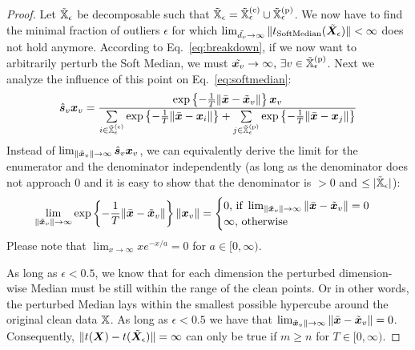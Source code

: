 \documentclass[sigconf,authordraft]{acmart}
\newcommand{\features}{\mX}
\newcommand{\featset}{\sX}
\newcommand{\softout}{\vs}
\newcommand{\pertm}{\tilde{\mX}_\epsilon}
\newcommand{\pertmset}{\tilde{\sX}_\epsilon}
\begin{document}
\begin{proof}\label{proof:actual_soft_median}
  Let \( \pertmset \) be decomposable such that \(\pertmset = \pertmset^{(\text{c})} \cup \pertmset^{(\text{p})} \). We now have to find the minimal fraction of outliers \(\epsilon\) for which \newline\(\lim_{\tilde{\evd_{v}} \to \infty} \|t_{\text{SoftMedian}}(\pertm)\| < \infty\) does not hold anymore. According to Eq.~\ref{eq:breakdown}, if we now want to arbitrarily perturb the Soft Median, 
  we must \(\tilde{\vx_{v}} \to \infty,\,\exists v \in \pertmset^{(\text{p})}\). Next we analyze the influence of this point on Eq.~\ref{eq:softmedian}:
  \[
    \begin{aligned}
      \hat{\softout}_{v} \vx_{v}
      &= \frac{\exp \left\{-\frac{1}{T} \|\bar{\vx} - \tilde{\vx}_{v}\| \right\} \vx_{v}}{\sum\limits_{i \in \pertmset^{(\text{c})}} \exp \left \{-\frac{1}{T} \|\bar{\vx} - \vx_{i}\| \right\} + \sum\limits_{j \in \pertmset^{(\text{p})}} \exp \left \{-\frac{1}{T} \|\bar{\vx} - \vx_{j}\| \right\}} \\
    \end{aligned}
  \]
  Instead of \(\lim_{\|\tilde{\vx}_{v}\| \to \infty} \hat{\softout}_{v} \vx_{v}\), we can equivalently derive the limit for the enumerator and the denominator independently (as long as the denominator does not approach 0 and it is easy to show that the denominator is \(> 0\) and \(\le |\pertmset|\)):
  \[
    \begin{aligned}
      \lim_{\|\tilde{{\bm{x}}}_{v}\| \to \infty} \exp \left\{-\frac{1}{T} \|\bar{{\bm{x}}} - \tilde{{\bm{x}}}_{v}\| \right\} \|{\bm{x}}_{v}\| = 
      \begin{cases}
        0 \text{, if } \lim_{\|\tilde{{\bm{x}}}_{v}\| \to \infty} \|\bar{{\bm{x}}} - \tilde{{\bm{x}}}_{v}\| = 0\\
        \infty\text{, otherwise}
      \end{cases}
    \end{aligned}
  \]
  Please note that \(\lim_{x \to \infty} x e^{-x/a} = 0\) for \(a \in [0, \infty)\). 
  
  As long as \(\epsilon < 0.5\), we know that for each dimension the perturbed dimension-wise Median must be still within the range of the clean points. Or in other words, the perturbed Median lays within the smallest possible hypercube around the original clean data \(\featset\). As long as \(\epsilon < 0.5\) we have that \(\lim_{\tilde{{\bm{x}}}_{v}\| \to \infty} \|\bar{{\bm{x}}} - \tilde{{\bm{x}}}_{v}\| = 0\). Consequently, \(\|t(\features)-t(\pertm)\| = \infty\) can only be true if \(m \ge n\) for \(T \in [0, \infty)\).
\end{proof}
\end{document}
